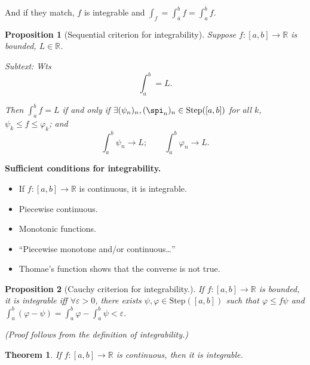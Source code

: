\documentclass[12pt]{article}
\newtheorem*{theorem}{Theorem}
\newtheorem*{prop}{Proposition}
\newcommand{\R}{\mathbb{R}}
\newcommand{\ol}{\overline}
\begin{document}
And if they match, $f$ is integrable and $\int_{f} = \int_{\ol{a}}^{b} f = \int_{a}^{\ol{b}} f$.

\begin{prop}[Sequential criterion for integrability] Suppose $f: [a, b] \to \R$ is bounded, $L \in \R$.  
  
  Subtext: Wts 
  \[
    \int_{a}^{b} = L.
  \]

  Then $\int_{a}^{b} f = L$ if and only if $\exists (\psi_n)_n, (\spi_n)_n \in \text{Step}([a, b])$ for all $k$,  $\psi_k \leq f \leq \varphi_k$; and
  \[
    \int_{a}^{b} \psi_n \to L; \qquad \int_{a}^{b} \varphi_n \to L.
  \]
\end{prop}

{\bf Sufficient conditions for integrability.}
  \begin{itemize}
    \item If $f: [a, b] \to \R$ is continuous, it is integrable.  
    \item Piecewise continuous.
    \item Monotonic functions.
    \item ``Piecewise monotone and/or continuous\dots''
    \item Thomae's function shows that the converse is not true.
  \end{itemize}

  \begin{prop}[Cauchy criterion for integrability.]
    If $f: [a, b] \to \R$ is bounded, it is integrable iff $\forall \varepsilon > 0$, there exists $\psi, \varphi \in \text{Step}([a, b])$ such that $\varphi \leq f \psi$ and $\int_{a}^{b} (\varphi - \psi) = \int_{a}^{b} \varphi - \int_{a}^{b} \psi < \varepsilon$.

    (Proof follows from the definition of integrability.)
  \end{prop}

  \begin{theorem}
    If $f: [a, b] \to \R$ is continuous, then it is integrable.
  \end{theorem}
\end{document}
